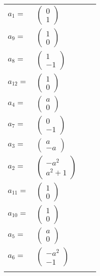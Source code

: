 \documentclass[1p]{elsarticle_modified}
\theoremstyle{definition}
\begin{document}
\begin{tabular}{m{7pt} m{180pt} m{7pt} m{180pt} }
\flushright $a_{1}=$&$\begin{pmatrix}0\\1\end{pmatrix}$ \\
\flushright $a_{9}=$&$\begin{pmatrix}1\\0\end{pmatrix}$ \\
\flushright $a_{8}=$&$\begin{pmatrix}1\\-1\end{pmatrix}$ \\
\flushright $a_{12}=$&$\begin{pmatrix}1\\0\end{pmatrix}$ \\
\flushright $a_{4}=$&$\begin{pmatrix}a\\0\end{pmatrix}$ \\
\flushright $a_{7}=$&$\begin{pmatrix}0\\-1\end{pmatrix}$ \\
\flushright $a_{3}=$&$\begin{pmatrix}a\\- a\end{pmatrix}$ \\
\flushright $a_{2}=$&$\begin{pmatrix}- a^2\\a^2+1\end{pmatrix}$ \\
\flushright $a_{11}=$&$\begin{pmatrix}1\\0\end{pmatrix}$ \\
\flushright $a_{10}=$&$\begin{pmatrix}1\\0\end{pmatrix}$ \\
\flushright $a_{5}=$&$\begin{pmatrix}a\\0\end{pmatrix}$ \\
\flushright $a_{6}=$&$\begin{pmatrix}- a^2\\-1\end{pmatrix}$\\&\end{tabular}
\end{document}
